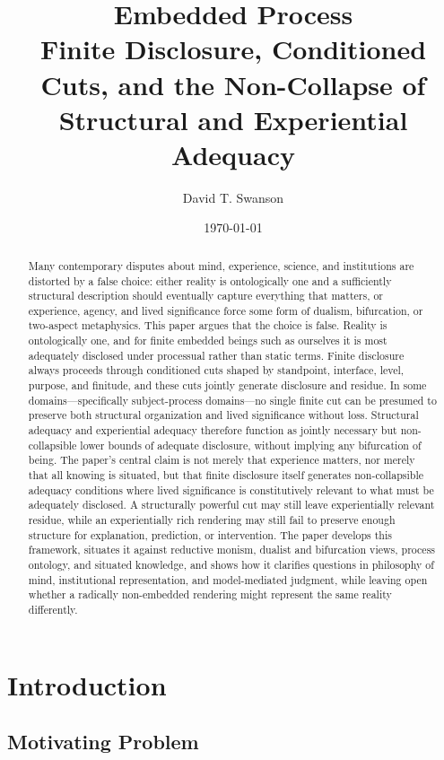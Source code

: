 \documentclass[11pt]{article}
\title{\textbf{Embedded Process}\\
\large Finite Disclosure, Conditioned Cuts, and the Non-Collapse of Structural and Experiential Adequacy}
\author{David T. Swanson}
\date{\today}
\begin{document}
\maketitle

\begin{abstract}
Many contemporary disputes about mind, experience, science, and institutions are distorted by a false choice: either reality is ontologically one and a sufficiently structural description should eventually capture everything that matters, or experience, agency, and lived significance force some form of dualism, bifurcation, or two-aspect metaphysics. This paper argues that the choice is false. Reality is ontologically one, and for finite embedded beings such as ourselves it is most adequately disclosed under processual rather than static terms. Finite disclosure always proceeds through conditioned cuts shaped by standpoint, interface, level, purpose, and finitude, and these cuts jointly generate disclosure and residue. In some domains---specifically subject-process domains---no single finite cut can be presumed to preserve both structural organization and lived significance without loss. Structural adequacy and experiential adequacy therefore function as jointly necessary but non-collapsible lower bounds of adequate disclosure, without implying any bifurcation of being. The paper's central claim is not merely that experience matters, nor merely that all knowing is situated, but that finite disclosure itself generates non-collapsible adequacy conditions where lived significance is constitutively relevant to what must be adequately disclosed. A structurally powerful cut may still leave experientially relevant residue, while an experientially rich rendering may still fail to preserve enough structure for explanation, prediction, or intervention. The paper develops this framework, situates it against reductive monism, dualist and bifurcation views, process ontology, and situated knowledge, and shows how it clarifies questions in philosophy of mind, institutional representation, and model-mediated judgment, while leaving open whether a radically non-embedded rendering might represent the same reality differently.
\end{abstract}

\section{Introduction}

\subsection{Motivating Problem}
\end{document}
